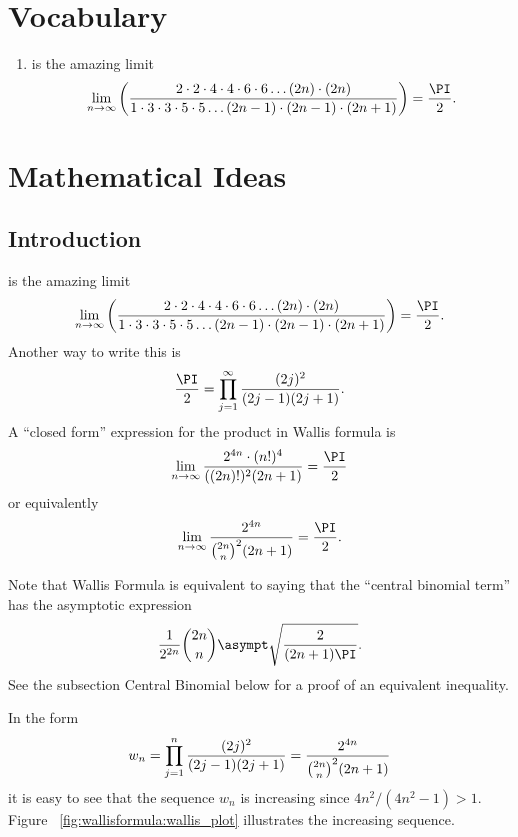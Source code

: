 \documentclass[12pt]{article}
\begin{document}
\hr

\section*{Vocabulary}
\begin{enumerate}
    \item
         is the amazing limit
        \[
            \lim_{n \to \infty} \left( \frac{ 2 \cdot 2 \cdot 4 \cdot 4
            \cdot 6 \cdot 6 \dots (2n) \cdot (2n)}{1 \cdot 3 \cdot 3
            \cdot 5 \cdot 5 \dots (2n-1) \cdot (2n-1)\cdot(2n+1)} \right)
            = \frac{\PI}{2}.
        \]
\end{enumerate}

\hr

\section*{Mathematical Ideas}
\subsection*{Introduction}  is the amazing limit
\begin{equation}
    \lim_{n \to \infty} \left( \frac{2 \cdot 2 \cdot 4 \cdot 4 \cdot 6
    \cdot 6 \dots (2n) \cdot (2n)}{1 \cdot 3 \cdot 3 \cdot 5 \cdot 5
    \dots (2n-1) \cdot (2n-1)\cdot(2n+1)} \right) = \frac{\PI}{2}.%
    \label{eq:wallisformula:wallis}
\end{equation}
%
Another way to write this is
\[
    \frac{\PI}{2} = \prod_{j=1}^{\infty} \frac{(2j)^2}{(2j-1)(2j+1)}.
\] A ``closed form'' expression for the product in Wallis formula is
\[
    \lim_{n \to \infty} \frac{ 2^{4n} \cdot (n!)^4}{((2n)!)^2(2n+1)} =
    \frac{\PI}{2}
\] or equivalently
\[
    \lim_{n \to \infty} \frac{ 2^{4n}}{{\binom{2n}{n}}^2 (2n+1)} = \frac
    {\PI}{2}.
\]

Note that Wallis Formula is equivalent to saying that the ``central
binomial term'' has the asymptotic expression
\[
    \frac{1}{2^{2n}} \binom{2n}{n} \asympt \sqrt{ \frac{2}{(2n+1)\PI} }.
\] See the subsection Central Binomial below for a proof of an
equivalent inequality.

In the form
\begin{equation}
    \label{eq:wallisformula:centralbinomexpansion} w_n = \prod_{j=1}^{n}
    \frac{(2j)^2}{(2j-1)(2j+1)} = \frac{2^{4n}}{%
    {\binom{2n}{n}}^2(2n+1)}
\end{equation}
it is easy to see that the sequence \( w_n \) is increasing since \( 4n^2/
(4n^2-1) > 1 \).  Figure~%
\ref{fig:wallisformula:wallis_plot} illustrates the increasing sequence.
\end{document}
